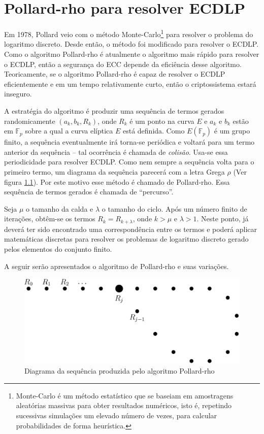 \chapter{Pollard-rho para resolver ECDLP}
Em 1978, Pollard veio com o método Monte-Carlo\footnote{Monte-Carlo é um método estatístico que se baseiam em amostragens aleatórias massivas para obter resultados numéricos, isto é, repetindo sucessivas simulações um elevado número de vezes, para calcular probabilidades de forma heurística.} para resolver o problema do logaritmo discreto. Desde então, o método foi modificado para resolver o ECDLP. Como o algoritmo Pollard-rho é atualmente o algoritmo mais rápido para resolver o ECDLP, então a segurança do ECC depende da eficiência desse algoritmo. Teoricamente, se o algoritmo Pollard-rho é capaz de resolver o ECDLP eficientemente e em um tempo relativamente curto, então o criptossistema estará inseguro. \cite{Mandy:2007}

A estratégia do algoritmo é produzir uma sequência de termos gerados randomicamente $(a_k, b_k, R_k)$, onde \(R_k\) é um ponto na curva \(E\) e \(a_k\)  e \(b_k\) estão em $\mathbb{F}_p$ sobre a qual a curva elíptica \(E\) está definida. Como $E(\mathbb{F}_p)$ é um grupo finito, a sequência eventualmente irá torna-se periódica e voltará para um termo anterior da sequência \--- tal ocorrência é chamada de \textit{colisão}. Usa-se essa periodicidade para resolver ECDLP. Como nem sempre a sequência volta para o primeiro termo, um diagrama da sequência parecerá com a letra Grega \(\rho\) (Ver figura \ref{fig:rho}). Por este motivo esse método é chamado de Pollard-rho. Essa sequência de termos gerados é chamada de ``percurso''.

Seja \(\mu\) o tamanho da calda e \(\lambda\) o tamanho do ciclo. Após um número finito de iterações, obtêm-se os termos $R_k = R_{k+\lambda}$, onde $k > \mu$ e $\lambda > 1$. Neste ponto, já deverá ter sido encontrado uma correspondência entre os termos e poderá aplicar matemáticas discretas para resolver os problemas de logaritmo discreto gerado pelos elementos do conjunto finito.

A seguir serão apresentados o algoritmo de Pollard-rho e suas variações.

\begin{figure}[h]
\centering
\includegraphics[scale=0.4, bb=0 0 888 376]{figuras/rho.eps}
\caption{Diagrama da sequência produzida pelo algoritmo Pollard-rho}
\label{fig:rho}
\end{figure}

